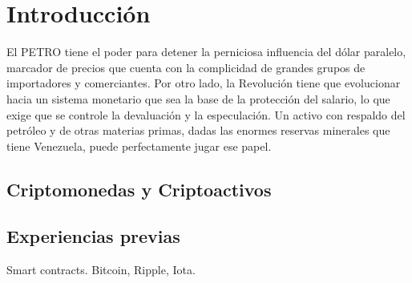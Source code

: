 %
\section{Introducción}
\label{sec:intro}
%
El PETRO tiene el poder para detener la perniciosa influencia del dólar paralelo, marcador de precios que cuenta con la complicidad de grandes grupos de importadores y comerciantes. Por otro lado, la Revolución tiene que evolucionar hacia un sistema monetario que sea la base de la protección del salario, lo que exige que se controle la devaluación y la especulación. Un activo con respaldo del petróleo y de otras materias primas, dadas las enormes reservas minerales que tiene Venezuela, puede perfectamente jugar ese papel.

\subsection{Criptomonedas y Criptoactivos}
\label{sec:cripto}

   
\subsection{Experiencias previas}
\label{sec:previous}

Smart contracts. Bitcoin, Ripple, Iota.

